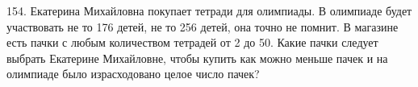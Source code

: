 154. Екатерина Михайловна покупает тетради для олимпиады. В олимпиаде будет участвовать не то 176 детей, не то 256 детей, она точно не помнит. В магазине есть пачки с любым количеством тетрадей от 2 до 50. Какие пачки следует выбрать Екатерине Михайловне, чтобы купить как можно меньше пачек и на олимпиаде было израсходовано целое число пачек?\\
